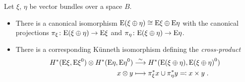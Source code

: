 \begin{Rem}
  Let $\xi$, $\eta$ be vector bundles over a space $B$.
  \begin{itemize}
  \item There is a canonical isomorphism
    $\mathrm{E}(\xi\oplus\eta)\cong\mathrm{E}\xi\oplus\mathrm{E}\eta$
    with the canonical projections
    $\pi_\xi\colon \mathrm{E}(\xi\oplus\eta)\to \mathrm{E}\xi$
    and
    $\pi_\eta\colon\mathrm{E}(\xi\oplus\eta)\to \mathrm{E}\eta$.
  \item There is a corresponding Künneth isomorphism
    defining the \emph{cross-product} 
    \begin{align*}
      H^*(\mathrm{E}\xi, {\mathrm{E}\xi}^0)
      \otimes
      H^*(\mathrm{E}\eta, {\mathrm{E}\eta}^0)
      &\overset{\sim}{\longrightarrow}
        H^*(\mathrm{E}(\xi\oplus\eta), {\mathrm{E}(\xi\oplus\eta)}^0)\\
      x\otimes y
      &\longmapsto
        {\pi}^*_\xi x \cup {\pi}^*_\eta y
        \eqqcolon x\times y
        \;.
    \end{align*}
    \cite[Theorem~3.18]{hatcher}
  \end{itemize}
\end{Rem}

